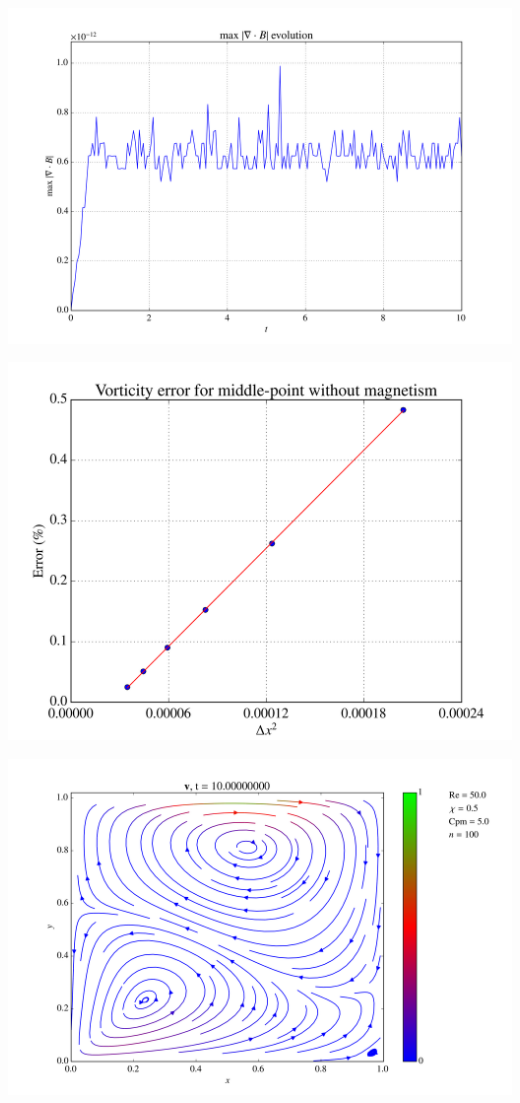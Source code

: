 \documentclass[portrait,a0paper,fontscale=0.40]{baposter} %
\begin{document}
\begin{poster}
{\begin{multicols}{2}
\begin{center}
\includegraphics[width=0.67\linewidth]{simulations/divBRe50N100Chi05Cpm5T10fps20.png}
\end{center}

\begin{center}
\includegraphics[width=0.67\linewidth]{validateHydrodynamicsRe40.png}
\end{center}


\begin{center}
\includegraphics[width=0.67\linewidth]{simulations/vRe50N100Chi05Cpm5T10fps20.png}
\end{center}


\end{multicols}}
\end{poster}
\end{document}
